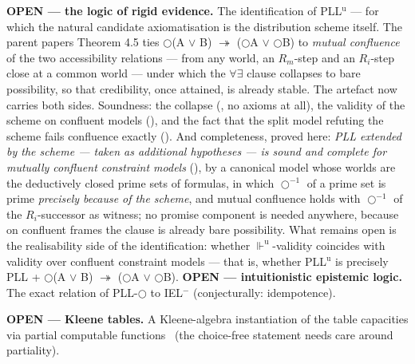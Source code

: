 \textbf{OPEN --- the logic of rigid evidence.} The identification of
PLL\ensuremath{{}^{\mathrm{u}}} --- for which the natural candidate
axiomatisation is the distribution scheme itself. The parent
paper\textquotesingle s Theorem 4.5 ties
\ensuremath{\bigcirc}(A \ensuremath{\vee} B) \ensuremath{\twoheadrightarrow}
(\ensuremath{\bigcirc}A \ensuremath{\vee} \ensuremath{\bigcirc}B) to
\emph{mutual confluence} of the two accessibility relations --- from
any world, an \ensuremath{R_{m}}-step and an \ensuremath{R_{i}}-step
close at a common world --- under which the \ensuremath{\forall\exists}
clause collapses to bare possibility, so that credibility, once
attained, is already stable. The artefact now carries both
sides. Soundness: the collapse
(, no axioms at all), the
validity of the scheme on confluent models
(), and the fact that
the split model refuting the scheme fails confluence exactly
(). And completeness, proved
here: \emph{PLL extended by the scheme --- taken as additional
hypotheses --- is sound and complete for mutually confluent constraint
models} (), by a canonical model whose worlds
are the deductively closed prime sets of formulas, in which
\ensuremath{\bigcirc^{-1}} of a prime set is prime \emph{precisely
because of the scheme}, and mutual confluence holds with
\ensuremath{\bigcirc^{-1}} of the \ensuremath{R_{i}}-successor as
witness; no promise component is needed anywhere, because on confluent
frames the clause is already bare possibility.
What remains open is the realisability side of the identification:
whether \ensuremath{\Vdash^{\mathrm{u}}}-validity coincides with
validity over confluent constraint models --- that is, whether
PLL\ensuremath{{}^{\mathrm{u}}} is precisely PLL +
\ensuremath{\bigcirc}(A \ensuremath{\vee} B) \ensuremath{\twoheadrightarrow}
(\ensuremath{\bigcirc}A \ensuremath{\vee} \ensuremath{\bigcirc}B).
\textbf{OPEN --- intuitionistic epistemic logic.} The exact relation
of PLL-\ensuremath{\bigcirc} to IEL\ensuremath{{}^{-}} (conjecturally:
idempotence).

\textbf{OPEN --- Kleene tables.} A
Kleene-algebra instantiation of the table capacities via partial
computable functions~\cite{Kleene1945} (the choice-free statement
needs care around partiality).

